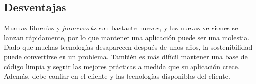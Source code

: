 \subsection{Desventajas}
Muchas librerías y \textit{frameworks} son bastante nuevos, y las nuevas versiones se lanzan rápidamente, por lo que mantener una aplicación puede ser una molestia. Dado que muchas tecnologías desaparecen después de unos años, la sostenibilidad puede convertirse en un problema. También es más difícil mantener una base de código limpia y seguir las mejores prácticas a medida que su aplicación crece. Además, debe confiar en el cliente y las tecnologías disponibles del cliente.